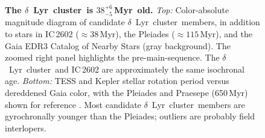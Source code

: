 \documentclass[12pt,modern,twocolumn,tighten,linenumbers]{aastex63}
\newcommand{\cn}{$\delta$\ Lyr\ cluster} %
\newcommand{\clusterage}{$38^{+6}_{-5}$\,Myr} %
\begin{document}
\begin{figure}[tp]
\begin{center}
		\vspace{-0.6cm}
	\end{center}
	\vspace{-0.7cm}
	\caption{
		{\bf The \cn\ is \clusterage\ old.}  {\it Top:} Color-absolute
		magnitude diagram of candidate \cn\ members, in addition to stars
		in IC\,2602 ($\approx38$\,Myr), the Pleiades ($\approx 115$\,Myr),
		and the Gaia EDR3 Catalog of Nearby Stars (gray background).  The
		zoomed right panel highlights the pre-main-sequence.  The \cn\ and
		IC\,2602 are approximately the same isochronal age.  {\it Bottom:}
		TESS and Kepler stellar rotation period versus dereddened Gaia
		color, with the Pleiades and Praesepe (650\,Myr) shown for
		reference \citep{rebull_rotation_2016a,douglas_poking_2017}.  Most
		candidate \cn\ members are gyrochronally younger than the
		Pleiades; outliers are probably field interlopers.
		\label{fig:age}
	}
\end{figure}
\end{document}
